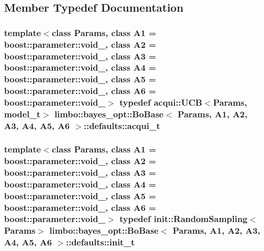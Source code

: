 

\subsection{Member Typedef Documentation}
\hypertarget{structlimbo_1_1bayes__opt_1_1_bo_base_1_1defaults_a4cb9b80ab762b3b763fdd97e893886e5}{}
\subsubsection[{acqui\+\_\+t}]{\setlength{\rightskip}{0pt plus 5cm}template$<$class Params, class A1 = boost\+::parameter\+::void\+\_\+, class A2 = boost\+::parameter\+::void\+\_\+, class A3 = boost\+::parameter\+::void\+\_\+, class A4 = boost\+::parameter\+::void\+\_\+, class A5 = boost\+::parameter\+::void\+\_\+, class A6 = boost\+::parameter\+::void\+\_\+$>$ typedef {\bf acqui\+::\+U\+C\+B}$<$Params, {\bf model\+\_\+t}$>$ {\bf limbo\+::bayes\+\_\+opt\+::\+Bo\+Base}$<$ Params, A1, A2, A3, A4, A5, A6 $>$\+::{\bf defaults\+::acqui\+\_\+t}}\label{structlimbo_1_1bayes__opt_1_1_bo_base_1_1defaults_a4cb9b80ab762b3b763fdd97e893886e5}
\hypertarget{structlimbo_1_1bayes__opt_1_1_bo_base_1_1defaults_a675d927a474fc77608cc63c8406448f7}{}
\subsubsection[{init\+\_\+t}]{\setlength{\rightskip}{0pt plus 5cm}template$<$class Params, class A1 = boost\+::parameter\+::void\+\_\+, class A2 = boost\+::parameter\+::void\+\_\+, class A3 = boost\+::parameter\+::void\+\_\+, class A4 = boost\+::parameter\+::void\+\_\+, class A5 = boost\+::parameter\+::void\+\_\+, class A6 = boost\+::parameter\+::void\+\_\+$>$ typedef {\bf init\+::\+Random\+Sampling}$<$Params$>$ {\bf limbo\+::bayes\+\_\+opt\+::\+Bo\+Base}$<$ Params, A1, A2, A3, A4, A5, A6 $>$\+::{\bf defaults\+::init\+\_\+t}}\label{structlimbo_1_1bayes__opt_1_1_bo_base_1_1defaults_a675d927a474fc77608cc63c8406448f7}
\hypertarget{structlimbo_1_1bayes__opt_1_1_bo_base_1_1defaults_a0a88a267bef731645079455cb11fa836}{}

